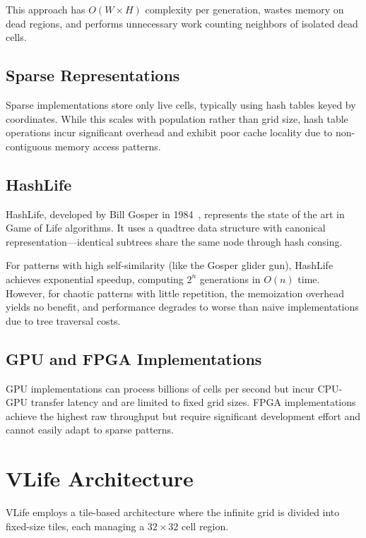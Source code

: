 \documentclass[11pt]{article}
\theoremstyle{definition}
\begin{document}
    This approach has $O(W \times H)$ complexity per generation, wastes memory on dead regions, and performs unnecessary work counting neighbors of isolated dead cells.

    \subsection{Sparse Representations}

    Sparse implementations store only live cells, typically using hash tables keyed by coordinates. While this scales with population rather than grid size, hash table operations incur significant overhead and exhibit poor cache locality due to non-contiguous memory access patterns.

    \subsection{HashLife}

    HashLife, developed by Bill Gosper in 1984~\cite{gosper1984}, represents the state of the art in Game of Life algorithms. It uses a quadtree data structure with canonical representation---identical subtrees share the same node through hash consing.

    For patterns with high self-similarity (like the Gosper glider gun), HashLife achieves exponential speedup, computing $2^n$ generations in $O(n)$ time. However, for chaotic patterns with little repetition, the memoization overhead yields no benefit, and performance degrades to worse than naive implementations due to tree traversal costs.

    \subsection{GPU and FPGA Implementations}

    GPU implementations can process billions of cells per second but incur CPU-GPU transfer latency and are limited to fixed grid sizes. FPGA implementations achieve the highest raw throughput but require significant development effort and cannot easily adapt to sparse patterns.

    \section{VLife Architecture}

    VLife employs a tile-based architecture where the infinite grid is divided into fixed-size tiles, each managing a $32 \times 32$ cell region.
\end{document}
